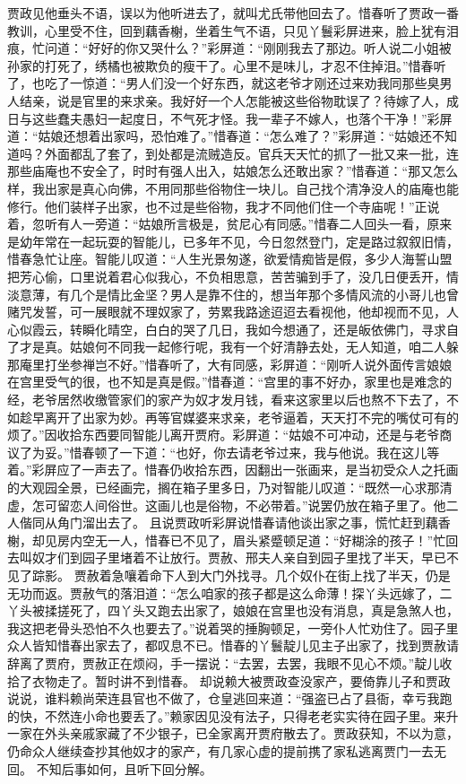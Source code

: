 \documentclass[12pt,oneside]{book}
\begin{document}
贾政见他垂头不语，误以为他听进去了，就叫尤氏带他回去了。惜春听了贾政一番教训，心里受不住，回到藕香榭，坐着生气不语，只见丫鬟彩屏进来，脸上犹有泪痕，忙问道：“好好的你又哭什么？”彩屏道：“刚刚我去了那边。听人说二小姐被孙家的打死了，绣橘也被欺负的瘦干了。心里不是味儿，才忍不住掉泪。”惜春听了，也吃了一惊道：“男人们没一个好东西，就这老爷才刚还过来劝我同那些臭男人结亲，说是官里的来求亲。我好好一个人怎能被这些俗物耽误了？待嫁了人，成日与这些蠢夫愚妇一起度日，不气死才怪。我一辈子不嫁人，也落个干净！”彩屏道：“姑娘还想着出家吗，恐怕难了。”惜春道：“怎么难了？”彩屏道：“姑娘还不知道吗？外面都乱了套了，到处都是流贼造反。官兵天天忙的抓了一批又来一批，连那些庙庵也不安全了，时时有强人出入，姑娘怎么还敢出家？”惜春道：“那又怎么样，我出家是真心向佛，不用同那些俗物住一块儿。自己找个清净没人的庙庵也能修行。他们装样子出家，也不过是些俗物，我才不同他们住一个寺庙呢！”正说着，忽听有人一旁道：“姑娘所言极是，贫尼心有同感。”惜春二人回头一看，原来是幼年常在一起玩耍的智能儿，已多年不见，今日忽然登门，定是路过叙叙旧情，惜春急忙让座。智能儿叹道：“人生光景匆遂，欲爱情痴皆是假，多少人海誓山盟把芳心偷，口里说着君心似我心，不负相思意，苦苦骗到手了，没几日便丢开，情淡意薄，有几个是情比金坚？男人是靠不住的，想当年那个多情风流的小哥儿也曾赌咒发誓，可一展眼就不理奴家了，劳累我路途迢迢去看视他，他却视而不见，人心似霞云，转瞬化晴空，白白的哭了几日，我如今想通了，还是皈依佛门，寻求自了才是真。姑娘何不同我一起修行呢，我有一个好清静去处，无人知道，咱二人躲那庵里打坐参禅岂不好。”惜春听了，大有同感，彩屏道：“刚听人说外面传言娘娘在宫里受气的很，也不知是真是假。”惜春道：“宫里的事不好办，家里也是难念的经，老爷居然收缴管家们的家产为奴才发月钱，看来这家里以后也熬不下去了，不如趁早离开了出家为妙。再等官媒婆来求亲，老爷逼着，天天打不完的嘴仗可有的烦了。”因收拾东西要同智能儿离开贾府。彩屏道：“姑娘不可冲动，还是与老爷商议了为妥。”惜春顿了一下道：“也好，你去请老爷过来，我与他说。我在这儿等着。”彩屏应了一声去了。惜春仍收拾东西，因翻出一张画来，是当初受众人之托画的大观园全景，已经画完，搁在箱子里多日，乃对智能儿叹道：“既然一心求那清虚，怎可留恋人间俗世。这画儿也是俗物，不必带着。”说罢仍放在箱子里了。他二人偕同从角门溜出去了。
且说贾政听彩屏说惜春请他谈出家之事，慌忙赶到藕香榭，却见房内空无一人，惜春已不见了，眉头紧蹙顿足道：“好糊涂的孩子！”忙回去叫奴才们到园子里堵着不让放行。贾赦、邢夫人亲自到园子里找了半天，早已不见了踪影。
贾赦着急嚷着命下人到大门外找寻。几个奴仆在街上找了半天，仍是无功而返。贾赦气的落泪道：“怎么咱家的孩子都是这么命薄！探丫头远嫁了，二丫头被揉搓死了，四丫头又跑去出家了，娘娘在宫里也没有消息，真是急煞人也，我这把老骨头恐怕不久也要去了。”说着哭的捶胸顿足，一旁仆人忙劝住了。园子里众人皆知惜春出家去了，都叹息不已。惜春的丫鬟靛儿见主子出家了，找到贾赦请辞离了贾府，贾赦正在烦闷，手一摆说：“去罢，去罢，我眼不见心不烦。”靛儿收拾了衣物走了。暂时讲不到惜春。
却说赖大被贾政查没家产，要倚靠儿子和贾政说说，谁料赖尚荣连县官也不做了，仓皇逃回来道：“强盗已占了县衙，幸亏我跑的快，不然连小命也要丢了。”赖家因见没有法子，只得老老实实待在园子里。来升一家在外头亲戚家藏了不少银子，已全家离开贾府散去了。贾政获知，不以为意，仍命众人继续查抄其他奴才的家产，有几家心虚的提前携了家私逃离贾门一去无回。
不知后事如何，且听下回分解。
\end{document}
